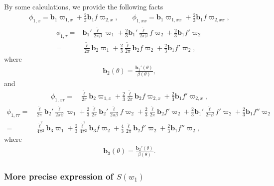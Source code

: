 \documentclass[10pt, reqno]{amsart}
\numberwithin{equation}{section}
\theoremstyle{definition}
\begin{document}
{{By some calculations, we provide the following facts
\begin{align*}
\phi_{1, x}
={\mathbf b}_1\varpi_{1,x} +\frac{2}{3}{\mathbf b}_1 f \varpi_{2,x},
\qquad
\phi_{1, xx}
={\mathbf b}_1\varpi_{1,xx} +\frac{2}{3}{\mathbf b}_1 f \varpi_{2,xx},
\end{align*}
\begin{align*}
\phi_{1, \tau}
= & {\mathbf b}_1'\frac{{\tilde\ell}}{2\pi \beta} \varpi_{1}
+
\frac{2}{3}{\mathbf b}_1'\frac{{\tilde\ell}}{2\pi\beta} f\varpi_{2}
+
 \frac{2}{3}{\mathbf b}_1 f'\varpi_{2}
\nonumber\\[2mm]
= & \frac{{\tilde\ell}}{2\pi} {\mathbf b}_2 \varpi_{1}
+
\frac{2}{3}\frac{{\tilde\ell}}{2\pi}{\mathbf b}_2f \varpi_{2}
+
\frac{2}{3}{\mathbf b}_1 f'\varpi_{2},
\end{align*}
where
\begin{align*}
{\mathbf b}_2(\theta)=\frac{{\mathbf b}_1'(\theta)}{\beta(\theta)},
\end{align*}
and
\begin{align*}
\phi_{1, x\tau}
= &
\frac{{\tilde\ell}}{2\pi} {\mathbf b}_2 \varpi_{1,x}
+
\frac{2}{3}\frac{{\tilde\ell}}{2\pi}{\mathbf b}_2 f\varpi_{2,x}
+
\frac{2}{3}{\mathbf b}_1 f'\varpi_{2,x},
\end{align*}
\begin{align*}
\phi_{1, \tau\tau}
= &
\frac{{\tilde\ell}}{2\pi} {\mathbf b}_2'\frac{{\tilde\ell}}{2\pi\beta} \varpi_{1}
+
\frac{2}{3}\frac{{\tilde\ell}}{2\pi}{\mathbf b}_2'\frac{{\tilde\ell}}{2\pi\beta}f \varpi_{2}
+
\frac{2}{3}\frac{{\tilde\ell}}{2\pi}{\mathbf b}_2f' \varpi_{2}
+
\frac{2}{3}{\mathbf b}_1'\frac{{\tilde\ell}}{2\pi\beta} f'\varpi_{2}
 +
\frac{2}{3}{\mathbf b}_1 f''\varpi_{2}
\nonumber\\
= &
\frac{{\tilde\ell}^2}{4\pi^2} {\mathbf b}_3 \varpi_{1}
+
\frac{2}{3}\frac{{\tilde\ell}^2}{4\pi^2}{\mathbf b}_3 f \varpi_{2}
+
\frac{4}{3}\frac{{\tilde\ell}}{2\pi}{\mathbf b}_2f' \varpi_{2}
+
\frac{2}{3}{\mathbf b}_1 f''\varpi_{2},
\label{expression of phi1tautau}
\end{align*}
where
\begin{align}
{\mathbf b}_3(\theta)=\frac{{\mathbf b}_2'(\theta)}{\beta(\theta)}.
\end{align}


\medskip
\subsubsection{More precise expression of $S(w_1)$}

}}
\end{document}
